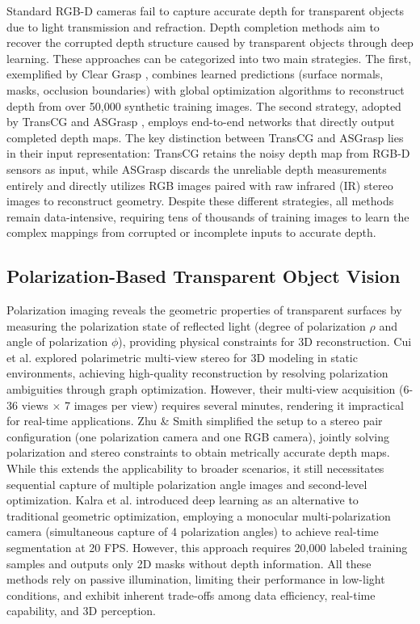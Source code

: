 \documentclass[letterpaper, 10 pt, conference]{ieeeconf}  %
\begin{document}
Standard RGB-D cameras fail to capture accurate depth for transparent objects 
due to light transmission and refraction. Depth completion methods aim to 
recover the corrupted depth structure caused by transparent objects through 
deep learning. These approaches can be categorized into two main strategies. 
The first, exemplified by Clear Grasp \cite{sajjan_clear_2020}, combines 
learned predictions (surface normals, masks, occlusion boundaries) with 
global optimization algorithms to reconstruct depth from over 50,000 synthetic 
training images. The second strategy, adopted by TransCG \cite{fang_transcg_2022} 
and ASGrasp \cite{shi_asgrasp_2024}, employs end-to-end networks that directly 
output completed depth maps. The key distinction between TransCG and ASGrasp 
lies in their input representation: TransCG retains the noisy depth map from 
RGB-D sensors as input, while ASGrasp discards the unreliable depth measurements 
entirely and directly utilizes RGB images paired with raw infrared (IR) stereo 
images to reconstruct geometry. Despite these different strategies, all methods 
remain data-intensive, requiring tens of thousands of training images to learn 
the complex mappings from corrupted or incomplete inputs to accurate depth.

\subsection{\textbf{Polarization-Based Transparent Object Vision}}

Polarization imaging reveals the geometric properties of transparent surfaces by measuring the polarization state of reflected light (degree of polarization $\rho$ and angle of polarization $\phi$), providing physical constraints for 3D reconstruction. Cui et al. \cite{cui_polarimetric_2017} explored polarimetric multi-view stereo for 3D modeling in static environments, achieving high-quality reconstruction by resolving polarization ambiguities through graph optimization. However, their multi-view acquisition (6-36 views $\times$ 7 images per view) requires several minutes, rendering it impractical for real-time applications. Zhu \& Smith \cite{zhu_depth_2019} simplified the setup to a stereo pair configuration (one polarization camera and one RGB camera), jointly solving polarization and stereo constraints to obtain metrically accurate depth maps. While this extends the applicability to broader scenarios, it still necessitates sequential capture of multiple polarization angle images and second-level optimization. Kalra et al. \cite{kalra_deep_2020} introduced deep learning as an alternative to traditional geometric optimization, employing a monocular multi-polarization camera (simultaneous capture of 4 polarization angles) to achieve real-time segmentation at 20 FPS. However, this approach requires 20,000 labeled training samples and outputs only 2D masks without depth information. All these methods rely on passive illumination, limiting their performance in low-light conditions, and exhibit inherent trade-offs among data efficiency, real-time capability, and 3D perception.
\end{document}
